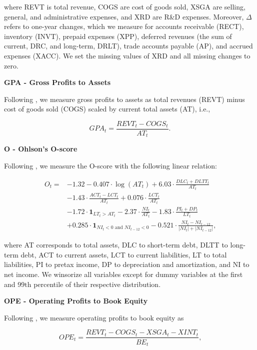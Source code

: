 \documentclass[
  article]{jss}
\begin{document}
where REVT is total revenue, COGS are cost of goods sold, XSGA are
selling, general, and administrative expenses, and XRD are R\&D
expenses. Moreover, \(\Delta\) refers to one-year changes, which we
measure for accounts receivable (RECT), inventory (INVT), prepaid
expenses (XPP), deferred revenues (the sum of current, DRC, and
long-term, DRLT), trade accounts payable (AP), and accrued expenses
(XACC). We set the missing values of XRD and all missing changes to
zero.

\textbf{GPA - Gross Profits to Assets}

Following \citet{novy-marx.2013}, we measure gross profits to assets as
total revenues (REVT) minus cost of goods sold (COGS) scaled by current
total assets (AT), i.e.,

\[
GPA_{t} = \frac{REVT_{t} - COGS_{t}}{AT_{t}}\text{.}
\]

\textbf{O - Ohlson's O-score}

Following \citet{ohlson.1980}, we measure the O-score with the following
linear relation:

\begin{align*}
O_{t} = &- 1.32 - 0.407 \cdot \log(AT_{t}) + 6.03 \cdot \frac{DLC_{t} + DLTT_{t}}{AT_{t}} \\
&- 1.43 \cdot \frac{ACT_{t} - LCT_{t}}{AT_{t}} + 0.076 \cdot \frac{LCT_{t}}{AT_{t}} \\
&- 1.72 \cdot \mathbf{1}_{LT_{t} > AT_{t}} - 2.37 \cdot \frac{NI_{t}}{AT_{t}} - 1.83 \cdot \frac{PI_{t} + DP_{t}}{LT_{t}} \\
&+ 0.285 \cdot \mathbf{1}_{NI_{t} < 0 \text{ and } NI_{t-12} < 0} - 0.521 \cdot \frac{NI_{t}-NI_{t-12}}{|NI_{t}| + |NI_{t-12}|}\text{,}
\end{align*}

where AT corresponds to total assets, DLC to short-term debt, DLTT to
long-term debt, ACT to current assets, LCT to current liabilities, LT to
total liabilities, PI to pretax income, DP to depreciation and
amortization, and NI to net income. We winsorize all variables except
for dummy variables at the first and 99\(\text{th}\) percentile of their
respective distribution.

\textbf{OPE - Operating Profits to Book Equity}

Following \citet{fama.2015}, we measure operating profits to book equity
as

\[
OPE_{t} = \frac{REVT_{t} - COGS_{t} - XSGA_{t} - XINT_{t}}{BE_{t}}\text{,}
\]
\end{document}
